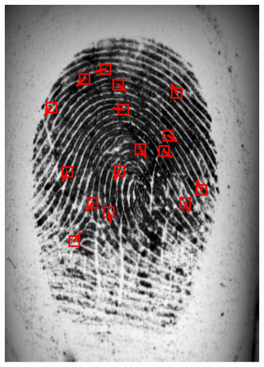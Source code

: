 \begin{figure}[htbp]
    \includegraphics[width=\figwidth\linewidth]{fig/minutiaenet/2.jpg}

\end{figure}
